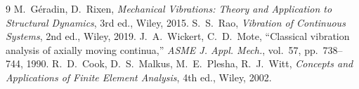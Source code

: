 \documentclass[11pt,a4paper]{article}
\begin{document}
\begin{thebibliography}{9}
 M.~G\'eradin, D.~Rixen, \emph{Mechanical Vibrations: Theory
and Application to Structural Dynamics}, 3rd ed., Wiley, 2015.
 S.~S.~Rao, \emph{Vibration of Continuous Systems}, 2nd ed.,
Wiley, 2019.
 J.~A.~Wickert, C.~D.~Mote, ``Classical vibration analysis of
axially moving continua,'' \emph{ASME J. Appl. Mech.}, vol.~57, pp.~738--744,
1990.
 R.~D.~Cook, D.~S.~Malkus, M.~E.~Plesha, R.~J.~Witt,
\emph{Concepts and Applications of Finite Element Analysis}, 4th ed., Wiley,
2002.
\end{thebibliography}
\end{document}
